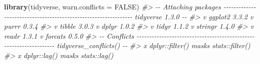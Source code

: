 \documentclass[
]{report}
\newenvironment{Shaded}{\begin{snugshade}}{\end{snugshade}}
\newcommand{\CommentTok}[1]{\textcolor[rgb]{0.56,0.35,0.01}{\textit{#1}}}
\newcommand{\DataTypeTok}[1]{\textcolor[rgb]{0.13,0.29,0.53}{#1}}
\newcommand{\KeywordTok}[1]{\textcolor[rgb]{0.13,0.29,0.53}{\textbf{#1}}}
\newcommand{\NormalTok}[1]{#1}
\newcommand{\OtherTok}[1]{\textcolor[rgb]{0.56,0.35,0.01}{#1}}
\begin{document}
\begin{Shaded}
\begin{Highlighting}[]
\KeywordTok{library}\NormalTok{(tidyverse, }\DataTypeTok{warn.conflicts =} \OtherTok{FALSE}\NormalTok{)}
\CommentTok{\#\textgreater{} {-}{-} Attaching packages {-}{-}{-}{-}{-}{-}{-}{-}{-}{-}{-}{-}{-}{-}{-}{-}{-}{-}{-}{-}{-}{-}{-}{-}{-}{-}{-}{-}{-}{-}{-}{-}{-}{-}{-}{-}{-}{-}{-}{-}{-}{-}{-}{-}{-}{-}{-}{-}{-}{-}{-}{-}{-}{-}{-}{-}{-}{-}{-}{-}{-}{-}{-}{-} tidyverse 1.3.0 {-}{-}}
\CommentTok{\#\textgreater{} v ggplot2 3.3.2     v purrr   0.3.4}
\CommentTok{\#\textgreater{} v tibble  3.0.3     v dplyr   1.0.2}
\CommentTok{\#\textgreater{} v tidyr   1.1.2     v stringr 1.4.0}
\CommentTok{\#\textgreater{} v readr   1.3.1     v forcats 0.5.0}
\CommentTok{\#\textgreater{} {-}{-} Conflicts {-}{-}{-}{-}{-}{-}{-}{-}{-}{-}{-}{-}{-}{-}{-}{-}{-}{-}{-}{-}{-}{-}{-}{-}{-}{-}{-}{-}{-}{-}{-}{-}{-}{-}{-}{-}{-}{-}{-}{-}{-}{-}{-}{-}{-}{-}{-}{-}{-}{-}{-}{-}{-}{-}{-}{-}{-}{-}{-}{-}{-}{-}{-}{-}{-}{-}{-} tidyverse\_conflicts() {-}{-}}
\CommentTok{\#\textgreater{} x dplyr::filter() masks stats::filter()}
\CommentTok{\#\textgreater{} x dplyr::lag()    masks stats::lag()}


\end{Highlighting}
\end{Shaded}
\end{document}
